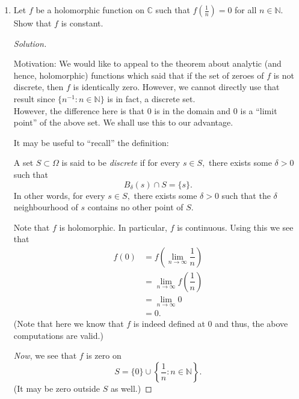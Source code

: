 \documentclass[12pt]{article}
\theoremstyle{definition}
\newenvironment{blockquote}
{\begin{mdframed}[skipabove=0pt, skipbelow=0pt, innertopmargin=4pt, innerbottommargin=4pt, bottomline=false,topline=false,rightline=false, linewidth=2pt]}
{\end{mdframed}}
\newenvironment{soln}{\begin{proof}[Solution]}{\end{proof}}
\begin{document}
\begin{enumerate}
\begin{soln}
\begin{equation*}
			f(2) = \sin\left(\dfrac{\pi}{2}\right) = 1 \neq 0. \qedhere
		\end{equation*}
	\end{soln}
	\item Let $f$ be a holomorphic function on $\mathbb{C}$ such that $f\left(\frac{1}{n}\right) = 0$ for all $n \in \mathbb{N}.$ Show that $f$ is constant.
	\begin{soln}\phantom{hi}\\
		\begin{blockquote}
		Motivation: We would like to appeal to the theorem about analytic (and hence, holomorphic) functions which said that if the set of zeroes of $f$ is not discrete, then $f$ is identically zero. However, we cannot directly use that result since $\{n^{-1} : n \in \mathbb{N}\}$ is in fact, a discrete set.\\
		However, the difference here is that $0$ is in the domain and $0$ is a ``limit point'' of the above set. We shall use this to our advantage.

		It may be useful to ``recall'' the definition:

		\begin{defn}
			A set $S \subset \Omega$ is said to be \emph{discrete} if for every $s \in S,$ there exists some $\delta > 0$ such that
			\begin{equation*} 
				B_\delta(s) \cap S = \{s\}.
			\end{equation*}
			In other words, for every $s \in S,$ there exists some $\delta > 0$ such that the $\delta$ neighbourhood of $s$ contains no other point of $S.$
		\end{defn}
		\end{blockquote}

		Note that $f$ is holomorphic. In particular, $f$ is continuous. Using this we see that
		\begin{align*} 
			f(0) &= f\left(\lim_{n\to \infty}\dfrac{1}{n}\right)\\
			&=\lim_{n\to \infty}f\left(\dfrac{1}{n}\right)\\
			&= \lim_{n\to \infty}0\\
			&= 0.
		\end{align*}
		(Note that here we know that $f$ is indeed defined at $0$ and thus, the above computations are valid.)

		\emph{Now}, we see that $f$ is zero on
		\begin{equation*} 
			S = \{0\}\cup\left\{\dfrac{1}{n} : n \in \mathbb{N}\right\}.
		\end{equation*}
		(It may be zero outside $S$ as well.)


\end{soln}
\end{enumerate}
\end{document}

